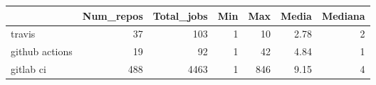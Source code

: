 \begin{tabular}{lrrrrrr}
\toprule
{} &  Num\_repos &  Total\_jobs &  Min &  Max &  Media &  Mediana \\
\midrule
travis         &         37 &         103 &    1 &   10 &   2.78 &        2 \\
github actions &         19 &          92 &    1 &   42 &   4.84 &        1 \\
gitlab ci      &        488 &        4463 &    1 &  846 &   9.15 &        4 \\
\bottomrule
\end{tabular}
